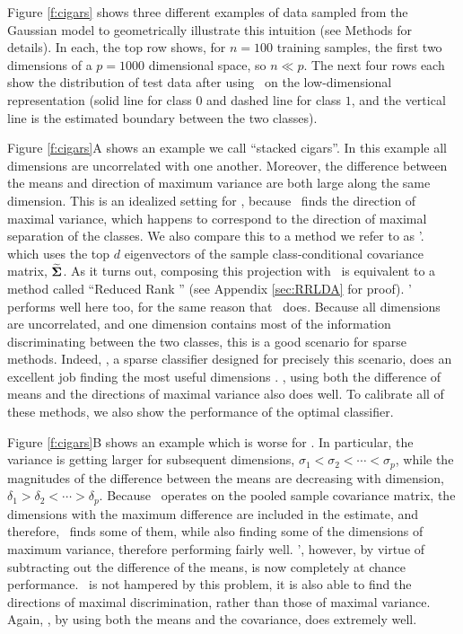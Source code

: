 \documentclass[10pt]{article}
\begin{document}
Figure \ref{f:cigars} shows three different examples of data sampled from the Gaussian model to geometrically illustrate this intuition (see Methods for details).
In each, the top row shows, for  $n=100$ training samples,  the first two dimensions  of a $p=1000$ dimensional space, so $n \ll p$.  
The next four rows each show the distribution of test data after using \Lda~on the low-dimensional representation (solid line for class $0$ and dashed line for class $1$, and the vertical line is the estimated boundary between the two classes). 

Figure \ref{f:cigars}{\color{magenta}A} shows an example we call  ``stacked cigars''.
In this example  all  dimensions are uncorrelated with one another.
Moreover, the difference between the means and direction of maximum variance are both large along the same dimension.
This is an idealized setting for \Pca, because \Pca~finds the direction of maximal variance, which happens to correspond to the direction of maximal separation of the classes.
We also compare this to a method we refer to as \Pca'. which uses the top $d$ eigenvectors of the sample class-conditional covariance matrix, $\widetilde{\boldsymbol{\Sigma}}$. 
As it turns out, composing this projection with \Lda~is equivalent to a method called ``Reduced Rank \Lda'' \cite{RRLDA} (see Appendix \ref{sec:RRLDA} for proof). 
\Pca' performs well here too, for the same reason that \Pca~does.
Because all dimensions are uncorrelated, and one dimension contains most of the information discriminating between the two classes, this is a good scenario for sparse methods.
Indeed,  \Road, a sparse classifier designed for precisely this scenario,  does an excellent job finding the most useful dimensions \cite{ROAD}.
\Lol, using both the difference of means and the directions of maximal variance also does well.  
To calibrate all of these methods, we also show the performance of the optimal classifier.


Figure \ref{f:cigars}{\color{magenta}B} shows an example which is worse for  \Pca.
In particular, the variance is getting larger for subsequent dimensions, $\sigma_1 < \sigma_2 < \cdots < \sigma_p$, while the magnitudes of the difference between the means are decreasing with dimension, $\delta_1 > \delta_2 < \cdots > \delta_p$.
Because \Pca~operates on the pooled sample covariance matrix, the dimensions with the maximum difference are included in the estimate, and therefore, \Pca~finds some of them, while also finding some of the dimensions of maximum variance, therefore performing fairly well.
\Pca', however, by virtue of subtracting out the difference of the means, is now completely at chance performance.
\Road~is not hampered by this problem, it is also able to find the directions of maximal discrimination, rather than those of maximal variance.
Again, \Lol, by using both the means and the covariance, does extremely well.
\end{document}
